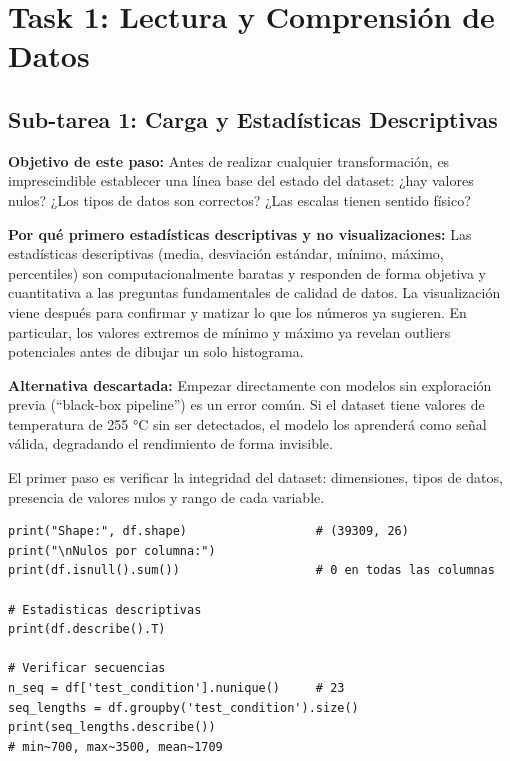 \documentclass[12pt,a4paper]{article}
\begin{document}
\section{Task 1: Lectura y Comprensión de Datos}

\subsection{Sub-tarea 1: Carga y Estadísticas Descriptivas}

\begin{whybox}
\textbf{Objetivo de este paso:} Antes de realizar cualquier transformación, es
imprescindible establecer una línea base del estado del dataset: ¿hay valores
nulos? ¿Los tipos de datos son correctos? ¿Las escalas tienen sentido físico?

\textbf{Por qué primero estadísticas descriptivas y no visualizaciones:}
Las estadísticas descriptivas (media, desviación estándar, mínimo, máximo,
percentiles) son computacionalmente baratas y responden de forma objetiva y
cuantitativa a las preguntas fundamentales de calidad de datos. La visualización
viene después para confirmar y matizar lo que los números ya sugieren. En particular,
los valores extremos de mínimo y máximo ya revelan outliers potenciales antes de
dibujar un solo histograma.

\textbf{Alternativa descartada:} Empezar directamente con modelos sin exploración
previa (``black-box pipeline'') es un error común. Si el dataset tiene valores de
temperatura de 255 °C sin ser detectados, el modelo los aprenderá como señal válida,
degradando el rendimiento de forma invisible.
\end{whybox}

El primer paso es verificar la integridad del dataset: dimensiones, tipos de datos,
presencia de valores nulos y rango de cada variable.

\begin{lstlisting}[caption={Estadísticas descriptivas básicas}, label={lst:describe}]
print("Shape:", df.shape)                  # (39309, 26)
print("\nNulos por columna:")
print(df.isnull().sum())                   # 0 en todas las columnas

# Estadisticas descriptivas
print(df.describe().T)

# Verificar secuencias
n_seq = df['test_condition'].nunique()     # 23
seq_lengths = df.groupby('test_condition').size()
print(seq_lengths.describe())
# min~700, max~3500, mean~1709
\end{lstlisting}
\end{document}
